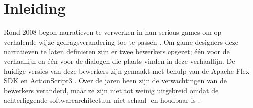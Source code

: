 \chapter{Inleiding}

Rond 2008 begon \organisation{} narratieven te verwerken in hun serious games om op
verhalende wijze gedragsverandering toe te passen \cite{interviewivo}. Om game designers deze
narratieven te laten definiëren zijn er twee bewerkers opgezet; één voor de verhaallijn en één voor de dialogen die plaats vinden in deze verhaallijn. De huidige
versies van deze bewerkers zijn gemaakt met behulp van de Apache Flex SDK
en ActionScript3 \cite{interviewivo}. Over de jaren heen zijn de verwachtingen van de bewerkers veranderd, maar ze zijn niet tot weinig uitgebreid omdat de achterliggende
softwarearchitectuur niet schaal- en houdbaar is \cite{interviewivo}.